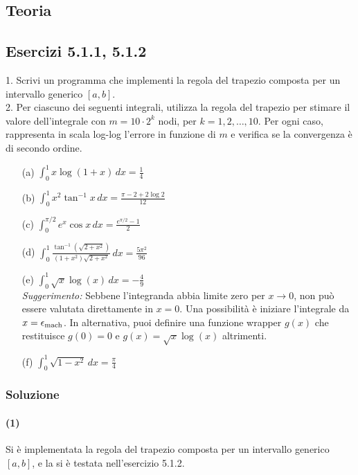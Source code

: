 \documentclass[letterpaper, 12pt]{article}
\begin{document}
\subsection{Teoria}

\subsection{Esercizi 5.1.1, 5.1.2}
1. Scrivi un programma che implementi la regola del trapezio composta per un intervallo generico $[a,b]$. \\
2. Per ciascuno dei seguenti integrali, utilizza la regola del trapezio per stimare il valore dell'integrale 
con $m=10\cdot 2^k$ nodi, per $k=1,2,\ldots,10$. Per ogni caso, rappresenta in scala log-log l'errore in funzione 
di $m$ e verifica se la convergenza è di secondo ordine.

\begin{itemize}
    \item[(a)] $\displaystyle \int_0^1 x\log(1+x)\, dx = \frac{1}{4}$
    \item[(b)] $\displaystyle \int_0^1 x^2 \tan^{-1}x\, dx = \frac{\pi-2+2\log 2}{12}$
    \item[(c)] $\displaystyle \int_0^{\pi/2}e^x \cos x\, dx = \frac{e^{\pi/2}-1}{2}$
    \item[(d)] $\displaystyle \int_0^1 \frac{\tan^{-1}(\sqrt{2+x^2})}{(1+x^2)\sqrt{2+x^2}}\,dx = \frac{5\pi^2}{96}$
    \item[(e)] $\displaystyle \int_0^1 \sqrt{x} \log(x) \, dx = -\frac{4}{9}$ \\
        \textit{Suggerimento:} Sebbene l'integranda abbia limite zero per $x\to 0$, non può essere valutata direttamente in $x=0$. 
        Una possibilità è iniziare l'integrale da $x=\epsilon_{\rm mach}$. In alternativa, puoi definire una 
        funzione wrapper $g(x)$ che restituisce $g(0)=0$ e $g(x)=\sqrt{x}\log(x)$ altrimenti.
    \item[(f)] $\displaystyle \int_0^1 \sqrt{1-x^2}\, dx = \frac{\pi}{4}$
\end{itemize}

\subsubsection{Soluzione}
\paragraph{(1) } Si è implementata la regola del trapezio composta per un intervallo generico $[a,b]$,
e la si è testata nell'esercizio 5.1.2. \\
\end{document}
